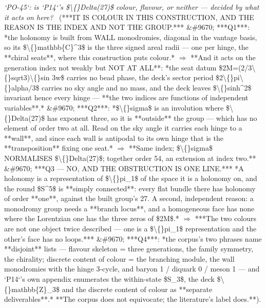 \begin{description}
\textit{`PO-45`: is `P14`'s \$\textbackslash\{\}Delta(27)\$ colour, flavour, or neither --- decided by what it acts on here?} \ (***IT IS COLOUR IN THIS CONSTRUCTION, AND THE REASON IS THE INDEX AND NOT THE GROUP.*** \&\#9670; ***Q1***: *the holonomy is built from WALL monodromies, diagonal in the vantage basis, so its \$\textbackslash\{\}mathbb\{C\}\textasciicircum{}3\$ is the three signed areal radii --- one per hinge, the **chiral seats**, where this construction puts colour.* \ensuremath{\Rightarrow} **And it acts on the generation index not weakly but NOT AT ALL**: *the seat datum \$2M=(2/3\textbackslash\{\}sqrt3)\textbackslash\{\}sin 3w\$ carries no bead phase, the deck's sector period \$2\textbackslash\{\}pi\textbackslash\{\}alpha/3\$ carries no sky angle and no mass, and the deck leaves \$\textbackslash\{\}sinh\textasciicircum{}2\$ invariant hence every hinge --- **the two indices are functions of independent variables**.* \&\#9670; ***Q2***: *\$\textbackslash\{\}sigma\$ is an involution where \$\textbackslash\{\}Delta(27)\$ has exponent three, so it is **outside** the group --- which has no element of order two at all. Read on the sky angle it carries each hinge to a **wall**, and since each wall is antipodal to its own hinge that is the **transposition** fixing one seat.* \ensuremath{\Rightarrow} **Same index; \$\textbackslash\{\}sigma\$ NORMALISES \$\textbackslash\{\}Delta(27)\$; together order 54, an extension at index two.** \&\#9670;  ***Q3 --- NO, AND THE OBSTRUCTION IS ONE LINE.*** *A holonomy is a representation of \$\textbackslash\{\}pi\_1\$ of the space it is a holonomy on, and the round \$S\textasciicircum{}5\$ is **simply connected**: every flat bundle there has holonomy of order **one**, against the built group's 27. A second, independent reason: a monodromy group needs a **branch locus**, and a homogeneous face has none where the Lorentzian one has the three zeros of \$2M\$.* \ensuremath{\Rightarrow} ***The two colours are not one object twice described --- one is a \$\textbackslash\{\}pi\_1\$ representation and the other's face has no loops.*** \&\#9670; ***Q4***: *the corpus's two phrases name **disjoint** lists --- flavour skeleton = three generations, the family symmetry, the chirality; discrete content of colour = the branching module, the wall monodromies with the hinge 3-cycle, and baryon 1 / diquark 0 / meson 1 --- and `P14`'s own appendix enumerates the within-state \$S\_3\$, the deck \$\textbackslash\{\}mathbb\{Z\}\_3\$ and the discrete content of colour as **separate deliverables**.* **The corpus does not equivocate; the literature's label does.**). 

\end{description}
